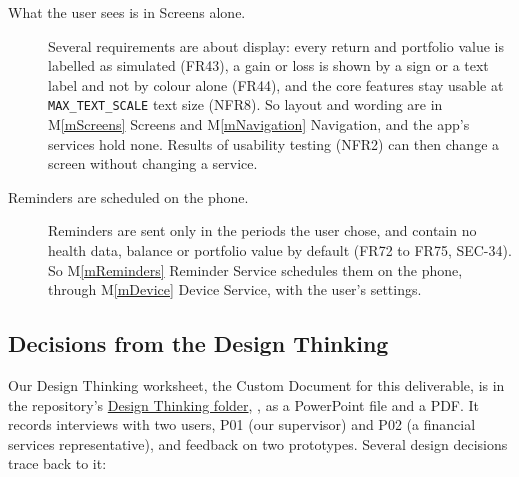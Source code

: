 \documentclass[12pt, titlepage]{article}
\newcommand{\mref}[1]{M\ref{#1}}
\begin{document}
\begin{description}
\item[What the user sees is in Screens alone.] Several requirements are about
  display: every return and portfolio value is labelled as simulated (FR43), a
  gain or loss is shown by a sign or a text label and not by colour alone
  (FR44), and the core features stay usable at \texttt{MAX\_TEXT\_SCALE} text
  size (NFR8). So layout and wording are in \mref{mScreens} Screens and
  \mref{mNavigation} Navigation, and the app's services hold none. Results of
  usability testing (NFR2) can then change a screen without changing a
  service.

\item[Reminders are scheduled on the phone.] Reminders are sent only in the
  periods the user chose, and contain no health data, balance or portfolio
  value by default (FR72 to FR75, SEC-34). So \mref{mReminders} Reminder
  Service schedules them on the phone, through \mref{mDevice} Device Service,
  with the user's settings.
\end{description}

\subsection{Decisions from the Design Thinking}

Our Design Thinking worksheet, the Custom Document for this deliverable, is in
the repository's
\href{https://github.com/davislenover/BurnNEarn/tree/main/docs/CDs/DesignThinking}{Design
Thinking folder}, , as a PowerPoint file and a
PDF.
It records interviews with two users, P01 (our supervisor) and P02 (a
financial services representative), and feedback on two prototypes. Several
design decisions trace back to it:
\end{document}
